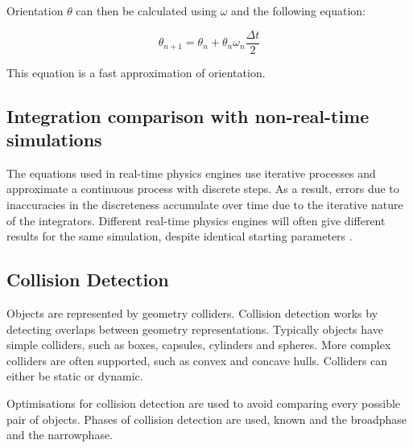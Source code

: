 Orientation $\theta$ can then be calculated using $\omega$ and the following equation:

\begin{equation}
\theta_{n+1}=\theta_n+\theta_n\omega_n\frac{\Delta t}{2}
\end{equation}

This equation is a fast approximation of orientation.

\subsection{Integration comparison with non-real-time simulations}
The equations used in real-time physics engines use iterative processes and approximate a continuous process with discrete steps. As a result, errors due to inaccuracies in the discreteness accumulate over time due to the iterative nature of the integrators. Different real-time physics engines will often give different results for the same simulation, despite identical starting parameters \cite{Boeing2007}.

\subsection{Collision Detection}\label{collision_detection}
Objects are represented by geometry colliders. Collision detection works by detecting overlaps between geometry representations.
Typically objects have simple colliders, such as boxes, capsules, cylinders and spheres. More complex colliders are often supported, such as convex and concave hulls. Colliders can either be static or dynamic.

Optimisations for collision detection are used to avoid comparing every possible pair of objects. Phases of collision detection are used, known and the broadphase and the narrowphase.






